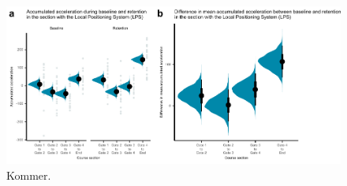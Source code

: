 \documentclass{article}
\begin{document}
\begin{figure}[H]
\centering
\includegraphics{figurer/figure_acc_acc.pdf}
\caption{Kommer.}\label{fig: accaccum}
\end{figure}






























\end{document}
